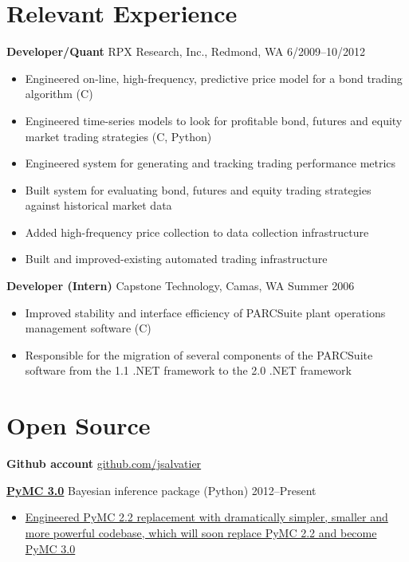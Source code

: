 \documentclass[margin]{res}
\newcommand{\bitem}{\begin{samepage}\begin{itemize} \itemsep -2pt}
\newcommand{\eitem}{\end{itemize}\end{samepage} }
\newcommand{\hrowbase}[3]{
  {\bf #1} #2 \hfill #3
}
\newcommand{\headrow}[3]{
  \hrowbase{#1}{#2}{#3}
    \vspace{6pt}
    \bitem
      }
\newcommand{\eheadrow}[0]{\eitem}
\newcommand{\CS}
{C\nolinebreak[4]\hspace{-.05em}\raisebox{.22ex}{\footnotesize\#}}
\begin{document}
 

\resumewidth=6.5in
\newsectionwidth{1.0in}
\begin{resume} 
 

\section{Relevant Experience}
  \headrow{Developer/Quant}{RPX Research, Inc., Redmond, WA}{6/2009--10/2012}
     \item Engineered on-line, high-frequency, predictive price model for a bond trading algorithm (\CS)
     \item Engineered time-series models to look for profitable bond, futures and equity market trading strategies (\CS, Python) 
     \item Engineered system for generating and tracking trading performance metrics 
     \item Built system for evaluating bond, futures and equity trading strategies against historical market data  
     \item Added high-frequency price collection to data collection infrastructure 
     \item Built and improved-existing automated trading infrastructure 
  \eheadrow

  \headrow{Developer (Intern)}{Capstone Technology, Camas, WA}{Summer 2006}
    \item Improved stability and interface efficiency of PARCSuite plant operations management software (\CS)
    \item Responsible for the migration of several components of the PARCSuite software from the 1.1 .NET framework to the 2.0 .NET framework 
  \eheadrow

 \section{Open Source}
 {\bf Github account} \href{https://github.com/jsalvatier}{github.com/jsalvatier}

    \headrow{\href{https://github.com/pymc-devs/pymc/commits/pymc3\#readme}{PyMC 3.0}}{Bayesian inference package (Python)}{2012--Present}
      \item \href{https://github.com/pymc-devs/pymc/commits/pymc3}{Engineered PyMC 2.2 replacement with dramatically simpler, smaller and more powerful codebase, which will soon replace PyMC 2.2 and become PyMC 3.0}
    \eheadrow


\end{resume}
\end{document}
